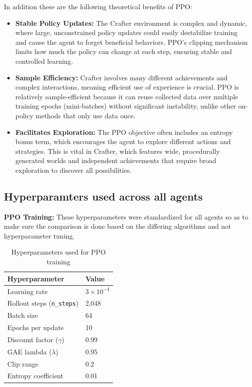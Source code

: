\documentclass[twocolumn]{article}
\begin{document}
In addition these are the following theoretical benefits of PPO:
\begin{itemize}
    \item \textbf{Stable Policy Updates:} The Crafter environment is complex and dynamic, where large, unconstrained policy updates could easily destabilize training and cause the agent to forget beneficial behaviors. PPO's clipping mechanism limits how much the policy can change at each step, ensuring stable and controlled learning.
    \item \textbf{Sample Efficiency:} Crafter involves many different achievements and complex interactions, meaning efficient use of experience is crucial. PPO is relatively sample-efficient because it can reuse collected data over multiple training epochs (mini-batches) without significant instability, unlike other on-policy methods that only use data once.
    \item \textbf{Facilitates Exploration:} The PPO objective often includes an entropy bonus term, which encourages the agent to explore different actions and strategies. This is vital in Crafter, which features wide, procedurally generated worlds and independent achievements that require broad exploration to discover all possibilities.
\end{itemize}

\subsection*{Hyperparamters used across all agents}
\textbf{PPO Training:} These hyperparameters were standardized for all agents so as to make sure the comparison is done based on the differing algorithms and not hyperparameter tuning.
\begin{table}[H]
\centering
\caption{Hyperparameters used for PPO training}
\begin{tabular}{@{}ll@{}}
\toprule
\textbf{Hyperparameter} & \textbf{Value} \\ \midrule
Learning rate & $3 \times 10^{-4}$ \\
Rollout steps (\texttt{n\_steps}) & 2,048 \\
Batch size & 64 \\
Epochs per update & 10 \\
Discount factor ($\gamma$) & 0.99 \\
GAE lambda ($\lambda$) & 0.95 \\
Clip range & 0.2 \\
Entropy coefficient & 0.01 \\ \bottomrule
\end{tabular}
\end{table}
\end{document}
